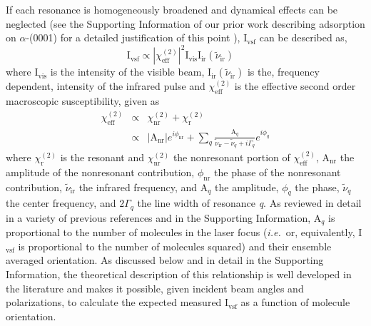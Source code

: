 \documentclass[twoside,twocolumn,9pt]{article}
\begin{document}
If each resonance is homogeneously broadened and dynamical effects can be neglected (see the Supporting Information of our prior work describing  adsorption on $\alpha$-(0001) for a detailed justification of this point \cite{kirsch2014}), $\text{I}_\text{vsf}$ can be described as,
\begin{equation}\label{e:line1}
\text{I}_{\text{vsf}} \propto \left| \chi_\text{eff}^{(2)} \right|^2 \text{I}_{\text{vis}}\text{I}_{\text{ir}}(\tilde{\nu}_{\text{ir}}) \quad
\end{equation}
%
where $\text{I}_{\text{vis}}$ is the intensity of the visible beam, $\text{I}_{\text{ir}}(\tilde{\nu}_{\text{ir}})$ is the, frequency dependent, intensity of the infrared pulse and $\chi^{(2)}_\mathrm{eff}$ is the effective second order macroscopic susceptibility, given as 
\begin{eqnarray}
\chi_{\text{eff}}^{(2)} & \propto & \chi^{(2)}_{\text{nr}} + \chi^{(2)}_{\text{r}}\nonumber\\  
	& \propto & \left|\text{A}_{\text{nr}}\right|e^{i\phi_\text{nr}} + \sum_{q} \frac{\text{A}_{q}}{\tilde{\nu}_{\text{ir}}-\tilde{\nu}_q + i\Gamma_q}e^{i\phi_{q}}\label{e:line2}
\end{eqnarray}
where $\chi^{(2)}_{\text{r}}$ is the resonant and $\chi^{(2)}_{\text{nr}}$ the nonresonant portion of $\chi^{(2)}_{\text{eff}}$, $\text{A}_{\text{nr}}$ the amplitude of the nonresonant contribution, $\phi_{\text{nr}}$ the phase of the nonresonant contribution, $\tilde{\nu}_{\text{ir}}$ the infrared frequency, and $\text{A}_{q}$ the amplitude, $\phi_{q}$ the phase, $\tilde{\nu}_{q}$ the center frequency, and $2\Gamma_q$ the line width of resonance \textit{q}. As reviewed in detail in a variety of previous references and in the Supporting Information, $\text{A}_{q}$ is proportional to the number of molecules in the laser focus (\textit{i.e.}\ or, equivalently, I$_{\text{vsf}}$ is proportional to the number of molecules squared) and their ensemble averaged orientation. As discussed below and in detail in the Supporting Information, the theoretical description of this relationship is well developed in the literature and makes it possible, given incident beam angles and polarizations, to calculate the expected measured I$_{\text{vsf}}$ as a function of molecule orientation\cite{zhu99,lam05}.  



\end{document}
